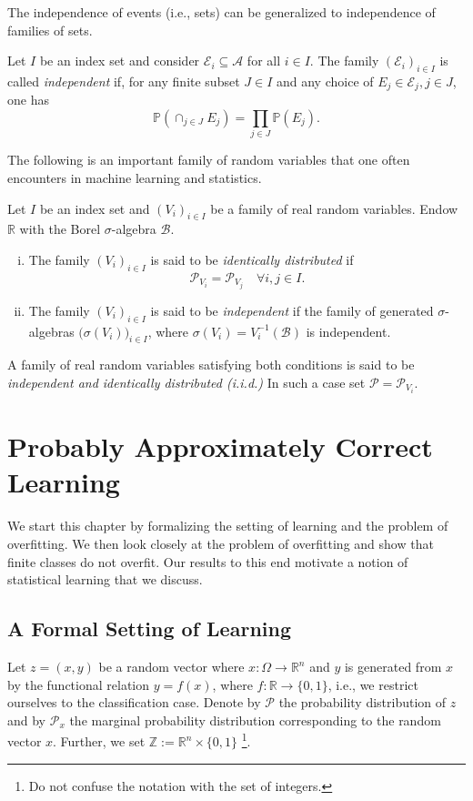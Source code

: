 The independence of events (i.e., sets) can be generalized to independence of
families of sets. 
\begin{definition}
        Let $I$ be an index set and consider $\mathcal{E}_i \subseteq \mathcal{A}$ for all $i \in I$.
        The family $(\mathcal{E}_i)_{i \in I}$ is called \emph{independent} if, for any finite subset 
        $J \in I$ and any choice of $E_j \in \mathcal{E}_j, j \in J$, one has 
        $$
        \mathbb{P}(\cap_{j \in J} E_j) = \prod_{j \in J} \mathbb{P}(E_j).
        $$
\end{definition}
The following is an important family of random variables that one often encounters 
in machine learning and statistics. 
\begin{definition}
	\label{def:iid}
	Let $I$ be an index set and $(V_i)_{i \in I}$ be a family of real random 
	variables. Endow $\mathbb{R}$ with the Borel $\sigma$-algebra $\mathcal{B}$.
	\begin{enumerate}[(i)]
		\item The family $(V_i)_{i \in I}$ is said to be \emph{identically distributed} if 
		$$\mathcal{P}_{V_i} = \mathcal{P}_{V_j} \quad \forall i, j \in I.$$
		\item The family $(V_i)_{i \in I}$ is said to be \emph{independent} if the 
		family of generated $\sigma$-algebras $\bigl(\sigma(V_i) \bigr)_{i\in I}$, where 
		$\sigma(V_i) = V_i^{-1}(\mathcal{B})$ is independent.
	\end{enumerate}
A family of real random variables satisfying both conditions is said to be
\emph{independent and identically distributed (i.i.d.)}
In such a case set $\mathcal{P} = \mathcal{P}_{V_i}$. \end{definition}

\section{Probably Approximately Correct Learning}

We start this chapter by formalizing the setting of learning and the problem of
overfitting. We then look closely at the problem of overfitting and show that
finite classes do not overfit. Our results to this end motivate a notion of
statistical learning that we discuss.

\subsection{A Formal Setting of Learning}
Let $z = (x, y)$ be a random vector where $x: \Omega \to \mathbb{R}^n$ and $y$
is generated from $x$ by the functional relation $y=f(x)$, where $f: \mathbb{R}
\to \{0,1\}$, i.e., we restrict ourselves to the classification case. Denote by
$\mathcal{P}$ the probability distribution of $z$ and by $\mathcal{P}_x$ the
marginal probability distribution corresponding to the random vector $x$.
Further, we set $\mathbb{Z} := \mathbb{R}^n \times \{0,1\}$ \footnote{Do not
confuse the notation with the set of integers.}.

